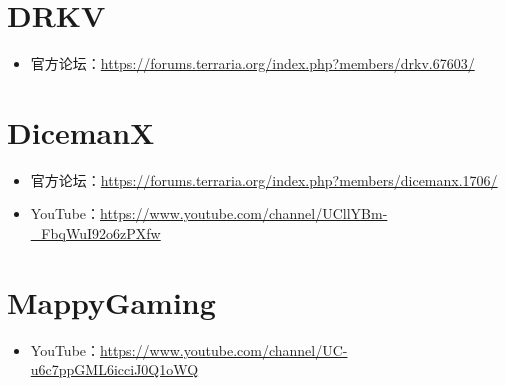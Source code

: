 \section{DRKV}
\begin{itemize}
    \item 官方论坛：\url{https://forums.terraria.org/index.php?members/drkv.67603/}
\end{itemize}
\section{DicemanX}
\begin{itemize}
    \item 官方论坛：\url{https://forums.terraria.org/index.php?members/dicemanx.1706/}
    \item YouTube：\url{https://www.youtube.com/channel/UCllYBm-_FbqWuI92o6zPXfw}
\end{itemize}
\section{MappyGaming}
\begin{itemize}
    \item YouTube：\url{https://www.youtube.com/channel/UC-u6c7ppGML6icciJ0Q1oWQ}
\end{itemize}
